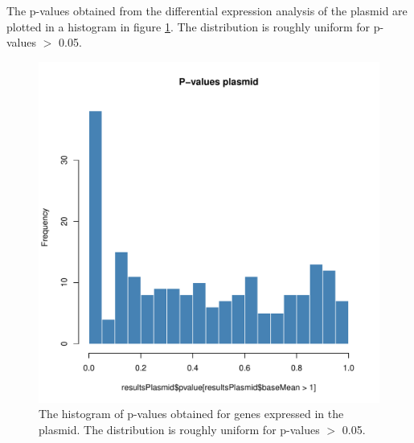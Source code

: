 The p-values obtained from the differential expression analysis of the plasmid are plotted in a histogram in figure \ref{fig:plasmid_hist}. The distribution is roughly uniform for p-values $>$ 0.05. 
\begin{figure}[h!]
    \centering
    \includegraphics[scale=0.5]{Figures/Histogram_pvalues_plasmid.pdf}
    \caption{The histogram of p-values obtained for genes expressed in the plasmid. The distribution is roughly uniform for p-values $>$ 0.05.}
    \label{fig:plasmid_hist}
\end{figure}
